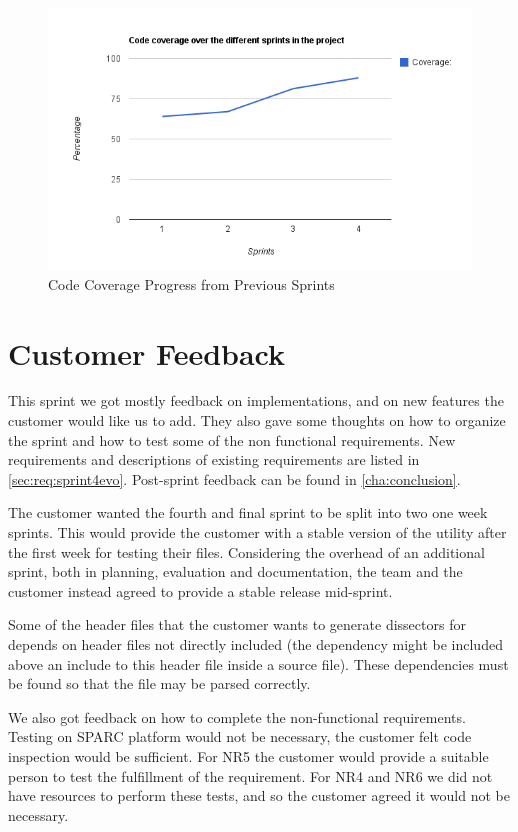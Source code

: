 \begin{figure}[htb]
	\center
	\includegraphics[width=\textwidth]{./sprints/img/sprint4_code_coverage_chart}
	\caption{Code Coverage Progress from Previous Sprints\label{fig:sp4CoverageChart}}
\end{figure}


\section{Customer Feedback}
\label{sec:sp4feedback}
This sprint we got mostly feedback on implementations, and on new features
the customer would like us to add. They also gave some thoughts on how to
organize the sprint and how to test some of the non functional requirements.
New requirements and descriptions of existing requirements are listed in
\autoref{sec:req:sprint4evo}. Post-sprint feedback can be found in
\autoref{cha:conclusion}.

The customer wanted the fourth and final sprint to be split into two one week
sprints. This would provide the customer with a stable version of the utility
after the first week for testing their files. Considering the overhead of an
additional sprint, both in planning, evaluation and documentation, the team
and the customer instead agreed to provide a stable release mid-sprint.

Some of the header files that the customer wants to generate dissectors for
depends on header files not directly included (the dependency might be
included above an include to this header file inside a source file). These
dependencies must be found so that the file may be parsed correctly.

We also got feedback on how to complete the non-functional requirements.
Testing on SPARC platform would not be necessary, the customer felt code
inspection would be sufficient. For NR5 the customer would provide a suitable
person to test the fulfillment of the requirement. For NR4 and NR6 we did not
have resources to perform these tests, and so the customer agreed it would
not be necessary.


